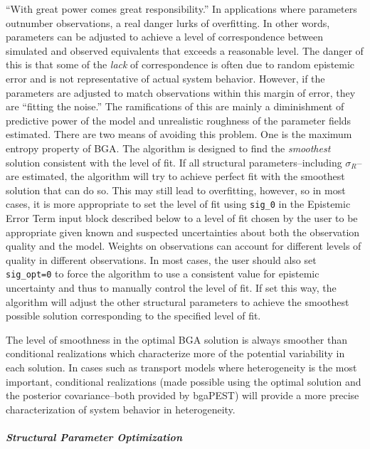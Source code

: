 \documentclass[11pt,oneside,onecolumn]{usgsreport}
\begin{document}
\begin{multicols}{2}
``With great power comes great responsibility.'' In applications
where parameters outnumber observations, a real danger lurks of overfitting.
In other words, parameters can be adjusted to achieve a level of correspondence
between simulated and observed equivalents that exceeds a reasonable
level. The danger of this is that some of the \emph{lack} of correspondence
is often due to random epistemic error and is not representative of
actual system behavior. However, if the parameters are adjusted to
match observations within this margin of error, they are ``fitting
the noise.'' The ramifications of this are mainly a diminishment
of predictive power of the model and unrealistic roughness of the
parameter fields estimated. There are two means of avoiding this problem.
One is the maximum entropy property of BGA. The algorithm is designed
to find the \emph{smoothest} solution consistent with the level of
fit. If all structural parameters--including $\sigma_{R}$--are estimated,
the algorithm will try to achieve perfect fit with the smoothest solution
that can do so. This may still lead to overfitting, however, so in
most cases, it is more appropriate to set the level of fit using \texttt{sig\_0}
in the Epistemic Error Term input block described below to a level
of fit chosen by the user to be appropriate given known and suspected
uncertainties about both the observation quality and the model. Weights
on observations can account for different levels of quality in different
observations. In most cases, the user should also set \texttt{sig\_opt=0}
to force the algorithm to use a consistent value for epistemic uncertainty
and thus to manually control the level of fit. If set this way, the
algorithm will adjust the other structural parameters to achieve the
smoothest possible solution corresponding to the specified level of
fit. 

The level of smoothness in the optimal BGA solution is always smoother
than conditional realizations \citep{Kitanidis1995} which characterize
more of the potential variability in each solution. In cases such
as transport models where heterogeneity is the most important, conditional
realizations (made possible using the optimal solution and the posterior
covariance--both provided by bgaPEST) will provide a more precise
characterization of system behavior in heterogeneity.


\subparagraph*{Structural Parameter Optimization}


\end{multicols}
\end{document}
